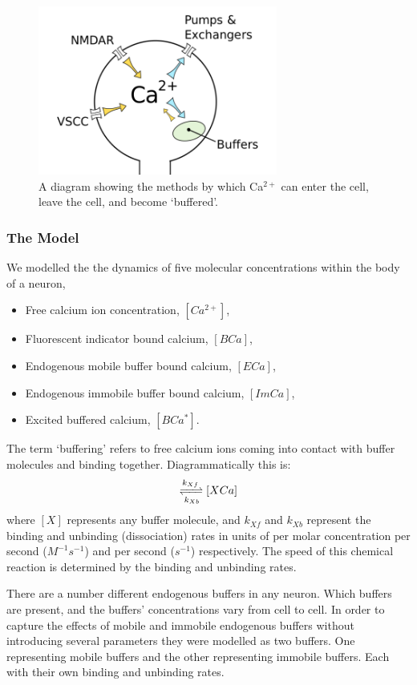 \documentclass[a4paper,12pt]{article}
\theoremstyle{definition}
\begin{document}
\begin{figure}[h]
  \centering
  \includegraphics[width=0.7\textwidth]{figures/cell_diagram.png}
  \caption{A diagram showing the methods by which Ca$^{2+}$ can enter the cell, leave the cell, and become `buffered'.}
  \label{fig:cell_diagram}
\end{figure}

\subsubsection{The Model}\label{sec:the_model}
We modelled the the dynamics of five molecular concentrations within the body of a neuron,
\begin{itemize}
  \item Free calcium ion concentration, $[Ca^{2+}]$,
  \item Fluorescent indicator bound calcium, $[BCa]$,
  \item Endogenous mobile buffer bound calcium, $[ECa]$,
  \item Endogenous immobile buffer bound calcium, $[ImCa]$,
  \item Excited buffered calcium, $[BCa^*]$.
\end{itemize}
The term `buffering' refers to free calcium ions coming into contact with buffer molecules and binding together. Diagrammatically this is:
\begin{equation*}
   [X][Ca^{2+}] \xrightleftharpoons[k_{Xb}]{k_{Xf}} [XCa]
\end{equation*}
where $[X]$ represents any buffer molecule, and $k_{Xf}$ and $k_{Xb}$ represent the binding and unbinding (dissociation) rates in units of per molar concentration per second ($M^{-1}s^{-1}$) and per second ($s^{-1}$) respectively. The speed of this chemical reaction is determined by the binding and unbinding rates.

There are a number different endogenous buffers in any neuron. Which buffers are present, and the buffers' concentrations vary from cell to cell. In order to capture the effects of mobile and immobile endogenous buffers without introducing several parameters they were modelled as two buffers. One representing mobile buffers and the other representing immobile buffers. Each with their own binding and unbinding rates.
\end{document}
